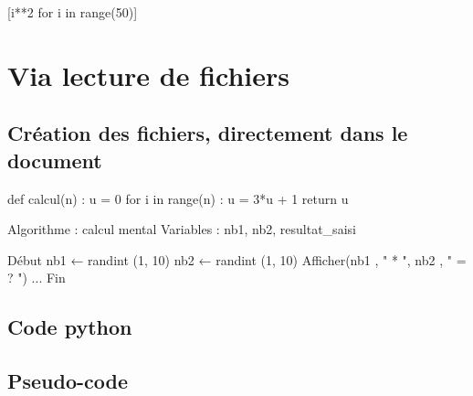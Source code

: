 \documentclass[french,a4paper,10pt]{article}
\begin{document}
\begin{PitonThonnyConsole}[Largeur=8cm]{}
[i**2 for i in range(50)]
\end{PitonThonnyConsole}

\pagebreak

\section{Via lecture de fichiers}

\subsection{Création des fichiers, directement dans le document}

{\small\begin{codehigh}
\begin{scontents}[overwrite,write-out=testscript.py]
def calcul(n) :
    u = 0
    for i in range(n) :
        u = 3*u + 1
    return u
\end{scontents}

\begin{scontents}[overwrite,write-out=testpcode.txt]
Algorithme : calcul mental
Variables  : nb1, nb2, resultat_saisi

Début
    nb1 ← randint (1, 10)
    nb2 ← randint (1, 10)
    Afficher(nb1 , " * ", nb2 , " = ? ")
...
Fin
\end{scontents}
\end{codehigh}}

\subsection{Code python}

{\small\begin{codehigh}

\end{codehigh}}



\subsection{Pseudo-code}

{\small\begin{codehigh}

\end{codehigh}}
\end{document}
